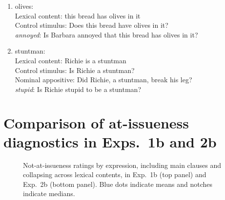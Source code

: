 \documentclass[11pt,fleqn]{article}
\newcommand{\6}{\mbox{$[\hspace*{-.6mm}[$}}
\newcommand{\9}{\mbox{$]\hspace*{-.6mm}]$}}
\begin{document}
\begin{enumerate}
\item olives:  \\
   	Lexical content: this bread has olives in it\\
   	Control stimulus: Does this bread have olives in it?\\
   	{\em annoyed}: Is Barbara annoyed that this bread has olives in it?

\item stuntman:  \\
   	Lexical content: Richie is a stuntman\\
   	Control stimulus: Is Richie a stuntman?\\
   	Nominal appositive: Did Richie, a stuntman, break his leg?\\
   	{\em stupid}: Is Richie stupid to be a stuntman?

\end{enumerate}

\section{Comparison of at-issueness diagnostics in Exps.~1b and 2b}\label{a-ai1b2b}

\begin{figure}[h!]
\begin{center}



\end{center}
\caption{Not-at-issueness ratings by expression, including main clauses and collapsing across lexical contents, in Exp.~1b (top panel) and Exp.~2b (bottom panel). Blue dots indicate means and notches indicate medians.}
\label{f-ai-b}
\end{figure}



\end{document}
